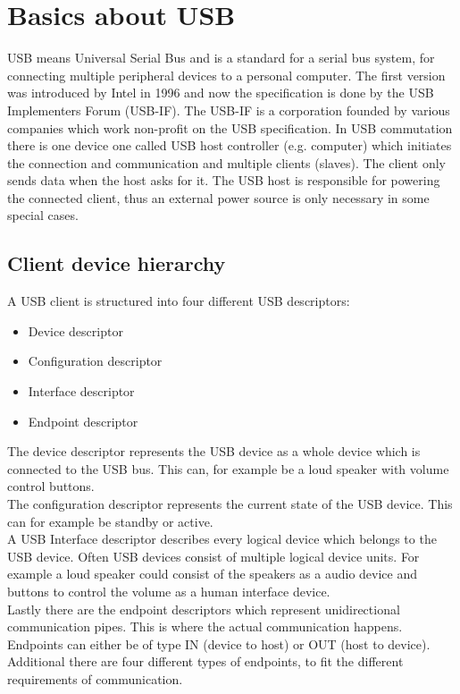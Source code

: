 \chapter{Basics about USB}

USB means Universal Serial Bus and is a standard for a serial bus system, for connecting multiple peripheral devices to a personal computer. The first version was introduced by Intel in 1996 and now the specification is done by the USB Implementers Forum (USB-IF). The USB-IF is a corporation founded by various companies which work non-profit on the USB specification. In USB commutation there is one device one called USB host controller (e.g. computer) which initiates the connection and communication and multiple clients (slaves). The client only sends data when the host asks for it. The USB host is responsible for powering the connected client, thus an external power source is only necessary in some special cases\cite{wiki_usb}.

\section{Client device hierarchy}

A USB client is structured into four different USB descriptors:

\begin{itemize}
\item Device descriptor
\item Configuration descriptor
\item Interface descriptor
\item Endpoint descriptor
\end{itemize}

The device descriptor represents the USB device as a whole device which is connected to the USB bus. This can, for example be a loud speaker with volume control buttons.\\
The configuration descriptor represents the current state of the USB device. This can for example be standby or active.\\
A USB Interface descriptor describes every logical device which belongs to the USB device. Often USB devices consist of multiple logical device units. For example a loud speaker could consist of the speakers as a audio device and buttons to control the volume as a human interface device. \\
Lastly there are the endpoint descriptors which represent unidirectional communication pipes. This is where the actual communication happens. Endpoints can either be of type IN (device to host) or OUT (host to device). Additional there are four different types of endpoints, to fit the different requirements of communication\cite{free_usb}.\\

